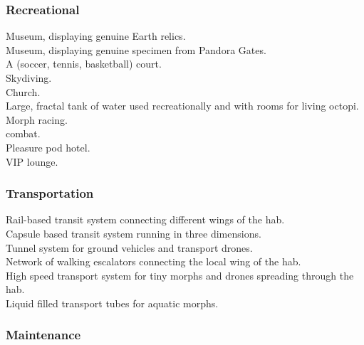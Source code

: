 \documentclass[a4]{article}
\begin{document}
\subsubsection{Recreational}

\starttableone
Museum, displaying genuine Earth relics.\\
Museum, displaying genuine specimen from Pandora Gates.\\
A (soccer, tennis, basketball) court.\\
Skydiving.\\
Church.\\
Large, fractal tank of water used recreationally and with rooms for living octopi.\\
Morph racing.\\
 combat.\\
Pleasure pod hotel.\\
VIP lounge.\\
\stoptableone



\starttableone

\stoptableone


\subsubsection{Transportation}

\starttableone
Rail-based transit system connecting different wings of the hab.\\
Capsule based transit system running in three dimensions.\\
Tunnel system for ground vehicles and transport drones.\\
Network of walking escalators connecting the local wing of the hab.\\
High speed transport system for tiny morphs and drones spreading through the hab.\\
Liquid filled transport tubes for aquatic morphs.\\
\stoptableone



\subsubsection{Maintenance}
\end{document}
